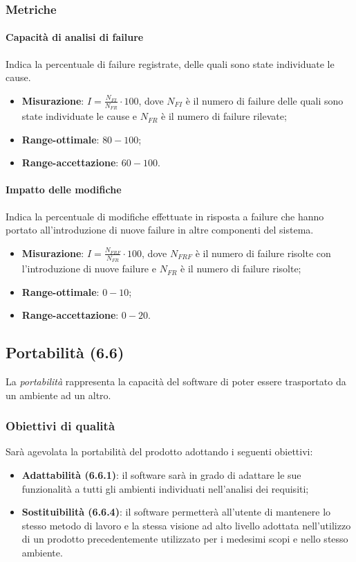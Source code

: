 \subsubsection{Metriche}
\paragraph{Capacità di analisi di failure}
\label{capacitaAnalisiFailure}
Indica la percentuale di failure registrate, delle quali sono state individuate le cause.
\begin{itemize}
\item \textbf{Misurazione}: $I=\frac{N_{FI}}{N_{FR}} \cdot 100$, dove $N_{FI}$ è il numero di failure delle quali sono state individuate le cause e $N_{FR}$ è il numero di failure rilevate;
\item \textbf{Range-ottimale}: $80 - 100$;
\item \textbf{Range-accettazione}: $60 - 100$.
\end{itemize}
\paragraph{Impatto delle modifiche}
Indica la percentuale di modifiche effettuate in risposta a failure che hanno portato all'introduzione di nuove failure in altre componenti del sistema.
\begin{itemize}
\item \textbf{Misurazione}: $I=\frac{N_{FRF}}{N_{FR}} \cdot 100$, dove $N_{FRF}$ è il numero di failure risolte con l'introduzione di nuove failure e $N_{FR}$ è il numero di failure risolte;
\item \textbf{Range-ottimale}: $0 - 10$;
\item \textbf{Range-accettazione}: $0 - 20$.
\end{itemize}

\subsection{Portabilità (6.6)}
\label{portabilita}
La \textit{portabilità} rappresenta la capacità del software di poter essere trasportato da un ambiente ad un altro.
\subsubsection{Obiettivi di qualità}
Sarà agevolata la portabilità del prodotto adottando i seguenti obiettivi:
\begin{itemize}
\item \textbf{Adattabilità (6.6.1)}: il software sarà in grado di adattare le sue funzionalità a tutti gli ambienti individuati nell'analisi dei requisiti;
\item \textbf{Sostituibilità (6.6.4)}: il software permetterà all'utente di mantenere lo stesso metodo di lavoro e la stessa visione ad alto livello adottata nell'utilizzo di un prodotto precedentemente utilizzato per i medesimi scopi e nello stesso ambiente.
\end{itemize}
